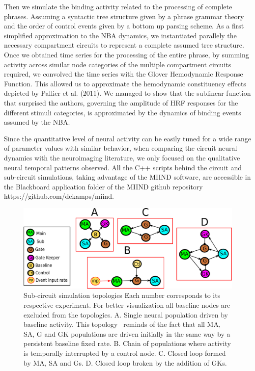 \documentclass[10pt]{article}
\begin{document}
Then we simulate the binding activity related to the processing of
complete phrases. Assuming a syntactic tree structure given by a phrase
grammar theory and the order of control events given by a bottom up
parsing scheme. As a first simplified approximation to the NBA dynamics,
we instantiated parallely the necessary compartment circuits to
represent a complete assumed tree structure. Once we obtained time
series for the processing of the entire phrase, by summing activity
across similar node categories of the multiple compartment circuits
required, we convolved the time series with the Glover Hemodynamic
Response Function\cite{Glover_1999}. This allowed us to approximate the
hemodynamic constituency effects depicted by Pallier et al.
(2011)\cite{Pallier_2011}. We managed to show that the sublinear function
that surprised the authors, governing the amplitude of HRF responses for
the different stimuli categories, is approximated by the dynamics of
binding events assumed by the NBA.

Since the quantitative level of neural activity can be easily tuned for
a wide range of parameter values with similar behavior, when comparing
the circuit neural dynamics with the neuroimaging literature, we only
focused on the qualitative neural temporal patterns observed. All the
C++ scripts behind the circuit and sub-circuit simulations, taking
advantage of the MIIND software\cite{de_Kamps_2008}\cite{harrison2011new}, are
accessible in the Blackboard application folder of the MIIND github
repository https://github.com/dekamps/miind.

\begin{figure}[h!]
\begin{center}
\includegraphics[width=0.70\columnwidth]{figures/sub_circuits3/sub_circuits3}
\caption{{Sub-circuit simulation topologies
{\label{637398}}
Each number corresponds to its respective experiment. For better
visualization all baseline nodes are excluded from the topologies. A.
Single neural population driven by baseline activity. This topology~
reminds of the fact that all MA, SA, G and GK populations are driven
initially in the same way by a persistent baseline fixed rate. B. Chain
of populations where activity is temporally interrupted by a control
node. C. Closed loop formed by MA, SA and Gs. D. Closed loop broken by
the addition of GKs.
{\label{637398}}%
}}
\end{center}
\end{figure}
\end{document}

